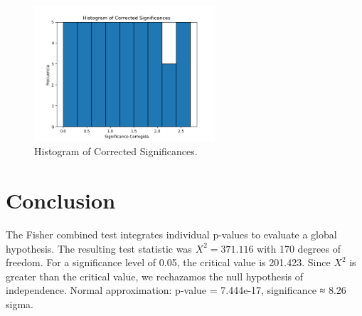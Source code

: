 \documentclass[12pt]{article}
\begin{document}
\begin{figure}[h!]
\centering
\includegraphics[width=0.6\textwidth]{corrected_significance_hist.png}
\caption{Histogram of Corrected Significances.}
\end{figure}

\section*{Conclusion}
The Fisher combined test integrates individual p-values to evaluate a global hypothesis.
The resulting test statistic was $X^2 = 371.116$ with 170 degrees of freedom.
For a significance level of 0.05, the critical value is 201.423.
Since $X^2$ is greater than the critical value, we rechazamos the null hypothesis of independence.
Normal approximation: p-value = 7.444e-17, significance ≈ 8.26 sigma.
\end{document}
